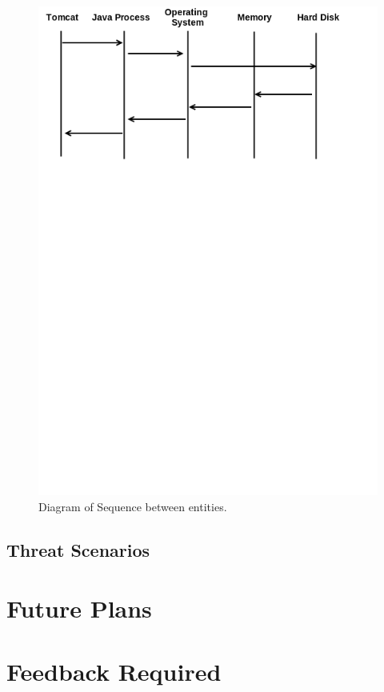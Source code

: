 \documentclass[11pt, a4paper, twoside, notitlepage]{article}
\begin{document}
\begin{figure}[h!]
    \centering
    \includegraphics[height=0.2\paperheight]{sequence_diagram}
    \caption{Diagram of Sequence between entities.}
\end{figure}





\subsection*{Threat Scenarios}





\section{Future Plans}





\section{Feedback Required}






\backmatter
\nocite{*}


\end{document}

